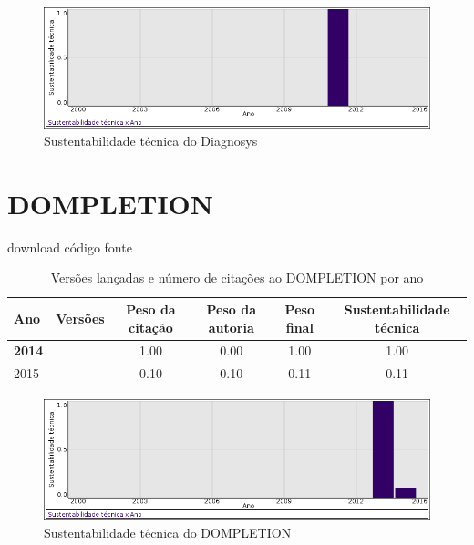\begin{figure}[h]
  \center
  \includegraphics[scale=0.50]{imagens/softwares-charts/diagnosys.png}
  \caption{Sustentabilidade técnica do Diagnosys}
\end{figure}


\section{DOMPLETION}
\checkmark download
\checkmark código fonte


\begin{table}[H]
\caption{Versões lançadas e número de citações ao DOMPLETION por ano}
\centering
\begin{tabular}{| l | c | c | c | c | c |}
  \hline
  Ano & Versões & Peso da citação & Peso da autoria & Peso final & Sustentabilidade técnica \\
  \hline
            {\bf 2014}
          &
          
          &
          1.00
          &
          0.00
          &
          1.00
          &
            {\color{blue} 1.00}
          \\
\hline
            2015
          &
          
          &
          0.10
          &
          0.10
          &
          0.11
          &
            {\color{red} 0.11}
          \\
\hline
\end{tabular}
\end{table}

\begin{figure}[h]
  \center
  \includegraphics[scale=0.50]{imagens/softwares-charts/dompletion.png}
  \caption{Sustentabilidade técnica do DOMPLETION}
\end{figure}


